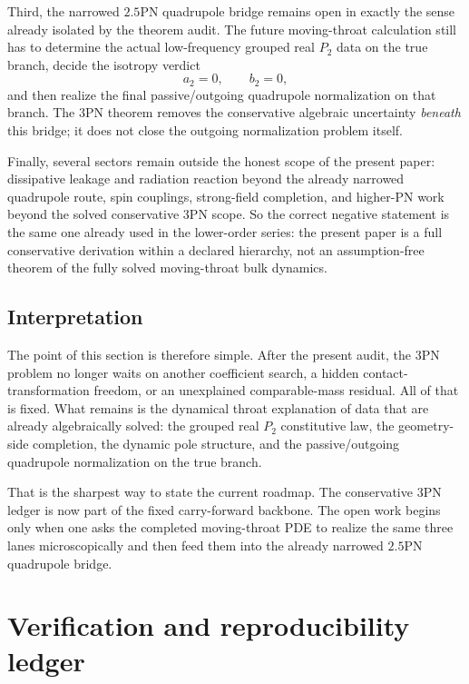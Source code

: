 \documentclass[11pt]{article}
\begin{document}
Third, the narrowed $2.5$PN quadrupole bridge remains open in exactly the sense
already isolated by the theorem audit.  The future moving-throat calculation
still has to determine the actual low-frequency grouped real $P_2$ data on the
true branch, decide the isotropy verdict
\begin{equation}
a_2=0,
\qquad
b_2=0,
\label{eq:fixed-open-isotropy-open}
\end{equation}
and then realize the final passive/outgoing quadrupole normalization on that
branch.  The $3$PN theorem removes the conservative algebraic uncertainty
\emph{beneath} this bridge; it does not close the outgoing normalization problem
itself.

Finally, several sectors remain outside the honest scope of the present paper:
dissipative leakage and radiation reaction beyond the already narrowed
quadrupole route, spin couplings, strong-field completion, and higher-PN work
beyond the solved conservative $3$PN scope.  So the correct negative statement
is the same one already used in the lower-order series: the present paper is a
full conservative derivation within a declared hierarchy, not an assumption-free
theorem of the fully solved moving-throat bulk dynamics.

\subsection{Interpretation}
\label{sec:fixed-open-interpretation}

The point of this section is therefore simple.  After the present audit, the
$3$PN problem no longer waits on another coefficient search, a hidden
contact-transformation freedom, or an unexplained comparable-mass residual.  All
of that is fixed.  What remains is the dynamical throat explanation of data that
are already algebraically solved: the grouped real $P_2$ constitutive law, the
geometry-side completion, the dynamic pole structure, and the passive/outgoing
quadrupole normalization on the true branch.

That is the sharpest way to state the current roadmap.  The conservative $3$PN
ledger is now part of the fixed carry-forward backbone.  The open work begins
only when one asks the completed moving-throat PDE to realize the same three
lanes microscopically and then feed them into the already narrowed $2.5$PN
quadrupole bridge.


\section{Verification and reproducibility ledger}
\label{sec:verification}
\end{document}
